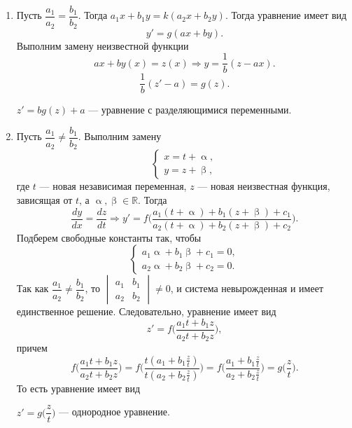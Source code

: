\documentclass[a4paper, 12pt]{report}
\newcommand{\Rm}{\mathbb{R}}
\renewcommand{\alpha}{\upalpha}
\renewcommand{\beta}{\upbeta}
\begin{document}
\begin{enumerate}
	\item Пусть $\dfrac{a_1}{a_2} = \dfrac{b_1}{b_2}$. Тогда $a_1x + b_1y = k(a_2x + b_2y)$. Тогда уравнение имеет вид $$y' = g(ax + by).$$
	Выполним замену неизвестной функции $$ax + by(x) = z(x)\Rightarrow y = \dfrac{1}{b}(z-ax).$$
	$$\dfrac{1}{b}(z' - a) = g(z).$$
	\begin{center}
		$ z' = bg(z) + a$ --- уравнение с разделяющимися переменными.
	\end{center}
\item Пусть $\dfrac{a_1}{a_2}\ne \dfrac{b_1}{b_2}$. Выполним замену $$\begin{cases}
	x = t + \alpha,\\
	y = z + \beta,
\end{cases}$$
где $t$ --- новая независимая переменная, $z$ --- новая неизвестная функция, зависящая от $t$, а $\alpha,\beta \in \Rm$. Тогда $$\dfrac{dy}{dx} = \dfrac{dz}{dt}\Rightarrow y' = f\Big(\dfrac{a_1(t+\alpha) + b_1(z+\beta) + c_1}{a_2(t+\alpha) + b_2(z+\beta) + c_2}\Big).$$
Подберем свободные константы так, чтобы $$\begin{cases}
	a_1\alpha + b_1\beta + c_1 = 0,\\
	a_2\alpha + b_2\beta + c_2 = 0.
\end{cases}$$
Так как $\dfrac{a_1}{a_2}\ne \dfrac{b_1}{b_2}$, то $\begin{vmatrix}
	a_1&b_1\\
	a_2&b_2
\end{vmatrix}\ne 0$, и система невырожденная и имеет единственное решение. Следовательно, уравнение имеет вид $$z' = f\Big(\dfrac{a_1 t + b_1 z}{a_2 t + b_2 z}\Big),$$
причем $$f\Big(\dfrac{a_1 t + b_1 z}{a_2 t + b_2 z}\Big) = f\Big(\dfrac{t(a_1  + b_1 \frac{z}{t})}{t(a_2  + b_2 \frac{z}{t})}\Big) = f\Big(\dfrac{a_1  + b_1 \frac{z}{t}}{a_2  + b_2 \frac{z}{t}}\Big) = g\Big(\dfrac{z}{t}\Big).$$
То есть уравнение имеет вид \begin{center}
	$z' = g\Big(\dfrac{z}{t}\Big)$ --- однородное уравнение.
\end{center}
\end{enumerate}
\end{document}
